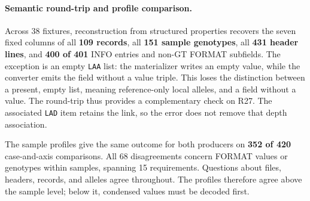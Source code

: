 \paragraph{Semantic round-trip and profile comparison.}
Across 38 fixtures, reconstruction from structured properties recovers the seven fixed columns of all \textbf{109 records}, all \textbf{151 sample genotypes}, all \textbf{431 header lines}, and \textbf{400 of 401} INFO entries and non-GT FORMAT subfields.
The exception is an empty \texttt{LAA} list: the materializer writes an empty value, while the converter emits the field without a value triple.
This loses the distinction between a present, empty list, meaning reference-only local alleles, and a field without a value.
The round-trip thus provides a complementary check on R27.
The associated \texttt{LAD} item retains the  link, so the error does not remove that depth association.

\label{sec:profilesresult}
The sample profiles give the same outcome for both producers on \textbf{352 of 420} case-and-axis comparisons.
All 68 disagreements concern FORMAT values or genotypes within samples, spanning 15 requirements.
Questions about files, headers, records, and alleles agree throughout.
The profiles therefore agree above the sample level; below it, condensed values must be decoded first.

